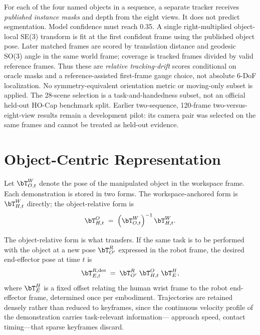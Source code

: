 For each of the four named objects in a sequence, a separate tracker receives
\emph{published instance masks} and depth from the eight views. It does not
predict segmentation. Model confidence must reach 0.35. A single
right-multiplied object-local SE(3) transform is fit at the first confident
frame using the published object pose. Later matched frames are scored by
translation distance and geodesic SO(3) angle in the same world frame;
coverage is tracked frames divided by valid reference frames. Thus these are
\emph{relative tracking-drift} scores conditional on oracle masks and a
reference-assisted first-frame gauge choice, not absolute 6-DoF localization.
No symmetry-equivalent orientation metric or moving-only subset is applied.
The 28-scene selection is a task-and-handedness subset, not an official
held-out HO-Cap benchmark split. Earlier two-sequence, 120-frame two-versus-
eight-view results remain a development pilot: its camera pair was selected
on the same frames and cannot be treated as held-out evidence.

\section{Object-Centric Representation}
\label{sec:objcentric}

Let $\bT^{W}_{O,t}$ denote the pose of the manipulated object in the workspace
frame. Each demonstration is stored in two forms. The workspace-anchored form
is $\bT^{W}_{H,t}$ directly; the object-relative form is
\begin{equation}
  \bT^{O}_{H,t} \;=\; \left(\bT^{W}_{O,t}\right)^{-1} \bT^{W}_{H,t}.
  \label{eq:objrel}
\end{equation}

The object-relative form is what transfers. If the same task is to be performed
with the object at a new pose $\bT^{R}_{O'}$ expressed in the robot frame, the
desired end-effector pose at time $t$ is
\begin{equation}
  \bT^{R,\mathrm{des}}_{E,t} \;=\;
  \bT^{R}_{O'} \; \bT^{O}_{H,t} \; \bT^{H}_{E},
  \label{eq:transfer}
\end{equation}
where $\bT^{H}_{E}$ is a fixed offset relating the human wrist frame to the
robot end-effector frame, determined once per embodiment. Trajectories are
retained densely rather than reduced to keyframes, since the continuous
velocity profile of the demonstration carries task-relevant information---
approach speed, contact timing---that sparse keyframes discard.

